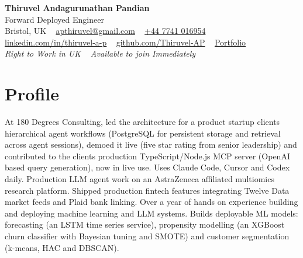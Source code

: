 \documentclass[a4paper,11pt]{article}
\begin{document}
\begin{center}
  {\fontsize{22}{26}\selectfont\bfseries\color{navy} Thiruvel Andagurunathan Pandian}\\[4pt]
  {\fontsize{12}{14}\selectfont\color{navy} Forward Deployed Engineer}\\[4pt]
  {\small
  Bristol, UK\nobreak\ \,\textperiodcentered\, \href{mailto:apthiruvel@gmail.com}{apthiruvel@gmail.com}\nobreak\ \,\textperiodcentered\, \href{tel:+447741016954}{+44 7741 016954}\nobreak\ \,\textperiodcentered\, \href{https://www.linkedin.com/in/thiruvel-a-p/}{linkedin.com/in/thiruvel-a-p}\nobreak\ \,\textperiodcentered\, \href{https://github.com/Thiruvel-AP}{github.com/Thiruvel-AP}\nobreak\ \,\textperiodcentered\, \href{https://thiruvel-ap.github.io/PersonalPortfolio/}{Portfolio}}\\[3pt]
  {\small\itshape\color{muted} Right to Work in UK\nobreak\ \,\textperiodcentered\, Available to join Immediately}

\end{center}

\section{Profile}
At 180 Degrees Consulting, led the architecture for a product startup client\textquotesingle{}s hierarchical agent workflows (PostgreSQL for persistent storage and retrieval across agent sessions), demoed it live (five star rating from senior leadership) and contributed to the client\textquotesingle{}s production TypeScript/Node.js MCP server (OpenAI based query generation), now in live use. Uses Claude Code, Cursor and Codex daily. Production LLM agent work on an AstraZeneca affiliated multiomics research platform. Shipped production fintech features integrating Twelve Data market feeds and Plaid bank linking. Over a year of hands on experience building and deploying machine learning and LLM systems. Builds deployable ML models: forecasting (an LSTM time series service), propensity modelling (an XGBoost churn classifier with Bayesian tuning and SMOTE) and customer segmentation (k-means, HAC and DBSCAN).
\end{document}
